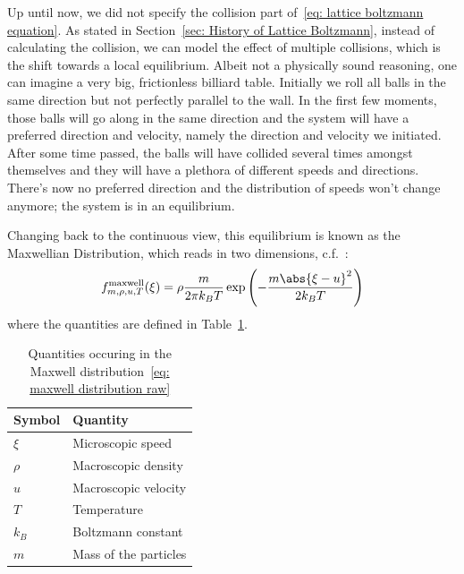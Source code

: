 Up until now, we did not specify the collision part of~\eqref{eq: lattice boltzmann equation}.
As stated in Section~\ref{sec: History of Lattice Boltzmann}, instead of calculating the collision, we can model the effect of multiple collisions, which is the shift towards a local equilibrium.
Albeit not a physically sound reasoning, one can imagine a very big, frictionless billiard table.
Initially we roll all balls in the same direction but not perfectly parallel to the wall.
In the first few moments, those balls will go along in the same direction and the system will have a preferred direction and velocity, namely the direction and velocity we initiated.
After some time passed, the balls will have collided several times amongst themselves and they will have a plethora of different speeds and directions.
There's now no preferred direction and the distribution of speeds won't change anymore; the system is in an equilibrium.

Changing back to the continuous view, this equilibrium is known as the Maxwellian Distribution, which reads in two dimensions, c.f.~\cite{succi2001lattice}:
\begin{equation}
  \label{eq: maxwell distribution raw}
  f_{m, \rho, u, T}^{\text{maxwell}}(\xi) = \rho \frac{m}{2\pi k_B T} \exp \left( - \frac{m\abs{\xi-u}^2}{2 k_B T}\right)
\end{equation}
where the quantities are defined in Table~\ref{table: maxwell quantities}.
\begin{table} [ht!]
\centering
  \begin{tabular}{@{}ll@{}}
    \toprule
    Symbol & Quantity  \\
    \midrule
    $\xi$  & Microscopic speed  \\
    $\rho$ & Macroscopic density     \\
    $u$    & Macroscopic velocity   \\
    $T$    & Temperature   \\
    $k_B$  & Boltzmann constant \\
    $m$    & Mass of the particles   \\
    \bottomrule
  \end{tabular}
\caption{Quantities occuring in the Maxwell distribution~\eqref{eq: maxwell distribution raw}}
\label{table: maxwell quantities}
\end{table}

